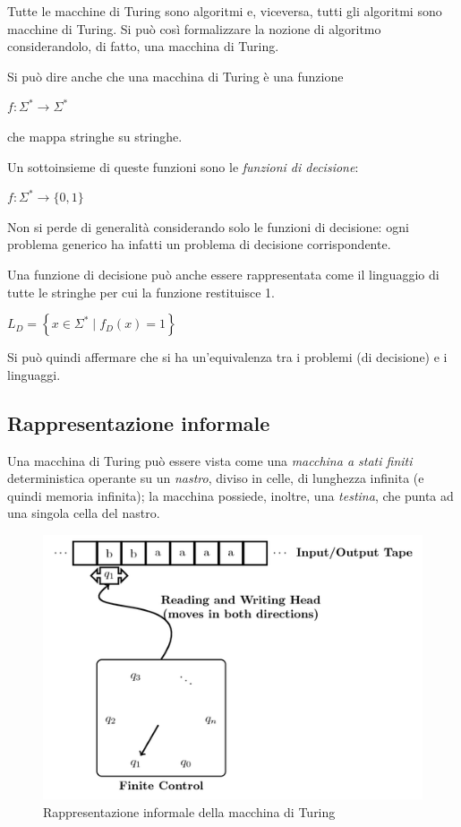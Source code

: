 Tutte le macchine di Turing sono algoritmi e, viceversa, tutti gli algoritmi
sono macchine di Turing.
Si può così formalizzare la nozione di algoritmo considerandolo, di fatto,
una macchina di Turing.

Si può dire anche che una macchina di Turing è una funzione
\begin{center}
    $f:  \Sigma^* \rightarrow \Sigma^*$
\end{center}
che mappa stringhe su stringhe.

Un sottoinsieme di queste funzioni sono le \textit{funzioni di decisione}:
\begin{center}
    $f: \Sigma^* \rightarrow \{ 0, 1 \}$
\end{center}
Non si perde di generalità considerando solo le funzioni di decisione:
ogni problema generico ha infatti un problema di decisione corrispondente.

Una funzione di decisione può anche essere rappresentata come il linguaggio di
tutte le stringhe per cui la funzione restituisce 1.
\begin{center}
    $L_D = \left\{ x \in \Sigma^* \; | \; f_D (x) = 1 \right\}$
\end{center}
Si può quindi affermare che si ha un'equivalenza tra i problemi (di decisione)
e i linguaggi.

\subsection*{Rappresentazione informale}
Una macchina di Turing può essere vista come una
\textit{macchina a stati finiti} deterministica operante su un \textit{nastro},
diviso in celle, di lunghezza infinita (e quindi memoria infinita);
la macchina possiede, inoltre, una \textit{testina}, che punta ad una singola
cella del nastro.
\begin{figure}[h]
    \centering
    \includegraphics[width=0.5\linewidth]{img/turing_machine.png}
    \caption{Rappresentazione informale della macchina di Turing}
    \label{fig:turing_machine}
\end{figure}

